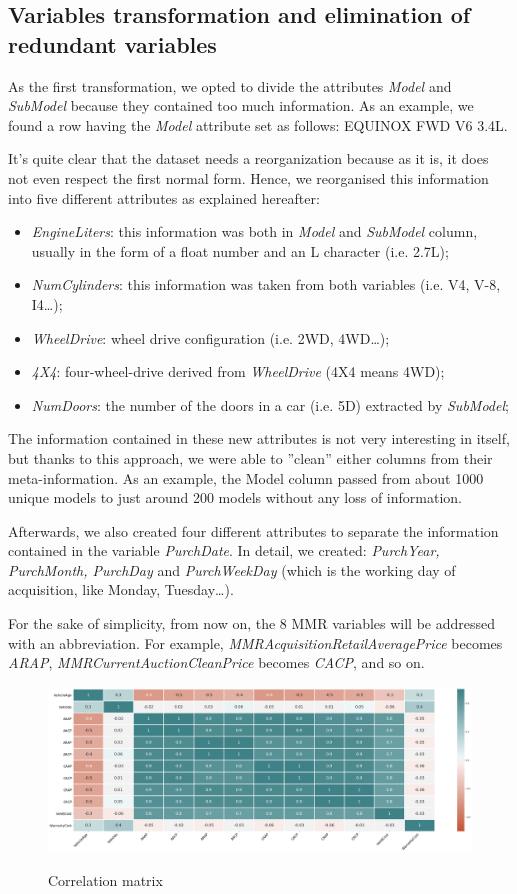 \documentclass{article}
\begin{document}
	\subsection{Variables transformation and elimination of redundant variables}
	As the first transformation, we opted to divide the attributes \emph{Model} and \emph{SubModel} because they contained too much information. As an example, we found a row having the \emph{Model} attribute set as follows: EQUINOX FWD V6 3.4L. 
	
	It's quite clear that the dataset needs a reorganization because as it is, it does not even respect the first normal form. Hence, we reorganised this information into five different attributes as explained hereafter:
	\begin{itemize}
		\item \emph{EngineLiters}: this information was both in \emph{Model} and \emph{SubModel} column, usually in the form of a float number and an L character (i.e. 2.7L);
		\item \emph{NumCylinders}: this information was taken from both variables (i.e. V4, V-8, I4\dots);
		\item \emph{WheelDrive}: wheel drive configuration (i.e. 2WD, 4WD\dots);
		\item \emph{4X4}: four-wheel-drive derived from \emph{WheelDrive} (4X4 means 4WD);
		\item \emph{NumDoors}: the number of the doors in a car (i.e. 5D) extracted by \emph{SubModel};
	\end{itemize}
	
	The information contained in these new attributes is not very interesting in itself, but thanks to this approach, we were able to ”clean” either columns from their meta-information. As an example, the Model column passed from about 1000 unique models to just around 200 models without any loss of information. 
	
	Afterwards, we also created four different attributes to separate the information contained in the variable \emph{PurchDate}. In detail, we created: \emph{PurchYear, PurchMonth, PurchDay} and \emph{PurchWeekDay} (which is the working day of acquisition, like Monday, Tuesday\dots).
	
	For the sake of simplicity, from now on, the 8 MMR variables will be addressed with an abbreviation. For example, \emph{MMRAcquisitionRetailAveragePrice} becomes \emph{ARAP}, \emph{MMRCurrentAuctionCleanPrice} becomes \emph{CACP}, and so on.
	
	
	\begin{figure}[H]
		\centering
		{\includegraphics[width=\textwidth]{corr.png}}
		\caption{{ Correlation matrix }}
		\label{fig:corr}
	\end{figure}
	
\end{document}
